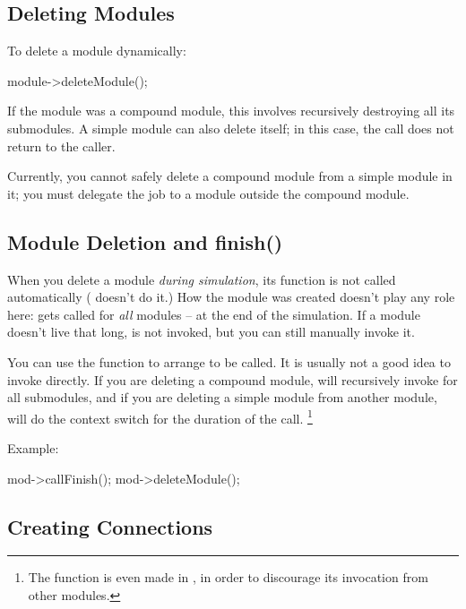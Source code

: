 \subsection{Deleting Modules}


To delete a module dynamically:

\begin{cpp}
module->deleteModule();
\end{cpp}

If the module was a compound module, this involves recursively
destroying all its submodules. A simple module can also delete itself;
in this case, the  call does not return to the
caller.

Currently, you cannot safely delete a
compound module from a simple module
in it; you must delegate the job to a module outside the compound
module.


\subsection{Module Deletion and finish()}

When you delete a module \textit{during simulation}, its 
function is not called automatically ( doesn't do it.)
How the module was created doesn't play any role here:
 gets called for \textit{all} modules -- at the end of the
simulation. If a module doesn't live that long,  is not
invoked, but you can still manually invoke it.

You can use the  function to arrange 
to be called. It is usually not a good idea to invoke 
directly. If you are deleting a compound module,  will
recursively invoke  for all submodules, and if you are deleting
a simple module from another module,  will do the context
switch for the duration of the call.
  \footnote{The  function is even made 
  in , in order to discourage its invocation from
  other modules.}

Example:

\begin{cpp}
mod->callFinish();
mod->deleteModule();
\end{cpp}


\subsection{Creating Connections}

